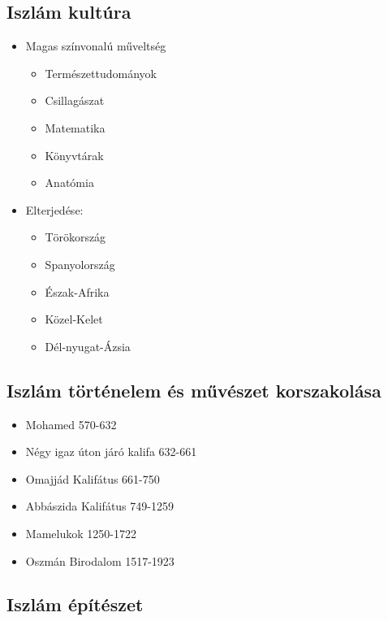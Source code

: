 \documentclass{article}
\begin{document}
\subsection{Iszlám kultúra}

\begin{itemize}
    
    \item Magas színvonalú műveltség
    \begin{itemize}
        \item Természettudományok
        \item Csillagászat
        \item Matematika
        \item Könyvtárak
        \item Anatómia
    \end{itemize}
    
    \item Elterjedése: 
    \begin{itemize}
        \item Törökország
        \item Spanyolország
        \item Észak-Afrika
        \item Közel-Kelet
        \item Dél-nyugat-Ázsia
    \end{itemize}
    
\end{itemize}

\subsection{Iszlám történelem és művészet korszakolása}

\begin{itemize}
    \item Mohamed 570-632
    \item Négy igaz úton járó kalifa 632-661
    \item Omajjád Kalifátus 661-750
    \item Abbászida Kalifátus 749-1259
    \item Mamelukok 1250-1722
    \item Oszmán Birodalom 1517-1923
\end{itemize}

\subsection{Iszlám építészet}
\end{document}
